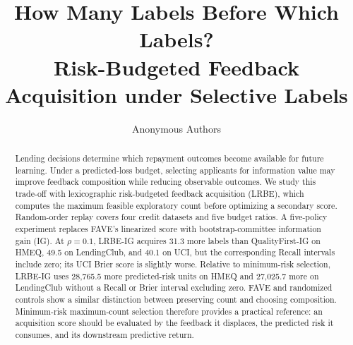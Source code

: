 \documentclass[runningheads]{llncs}
\title{How Many Labels Before Which Labels?\texorpdfstring{\\}{: }Risk-Budgeted Feedback Acquisition under Selective Labels}
\author{Anonymous Authors}
\institute{Anonymous Institution}
\begin{document}
\maketitle
\begin{abstract}
Lending decisions determine which repayment outcomes become available for future learning. Under a predicted-loss budget, selecting applicants for information value may improve feedback composition while reducing observable outcomes. We study this trade-off with lexicographic risk-budgeted feedback acquisition (LRBE), which computes the maximum feasible exploratory count before optimizing a secondary score. Random-order replay covers four credit datasets and five budget ratios. A five-policy experiment replaces FAVE's linearized score with bootstrap-committee information gain (IG). At $\rho=0.1$, LRBE-IG acquires 31.3 more labels than QualityFirst-IG on HMEQ, 49.5 on LendingClub, and 40.1 on UCI, but the corresponding Recall intervals include zero; its UCI Brier score is slightly worse. Relative to minimum-risk selection, LRBE-IG uses 28,765.5 more predicted-risk units on HMEQ and 27,025.7 more on LendingClub without a Recall or Brier interval excluding zero. FAVE and randomized controls show a similar distinction between preserving count and choosing composition. Minimum-risk maximum-count selection therefore provides a practical reference: an acquisition score should be evaluated by the feedback it displaces, the predicted risk it consumes, and its downstream predictive return.
\end{abstract}









\end{document}
